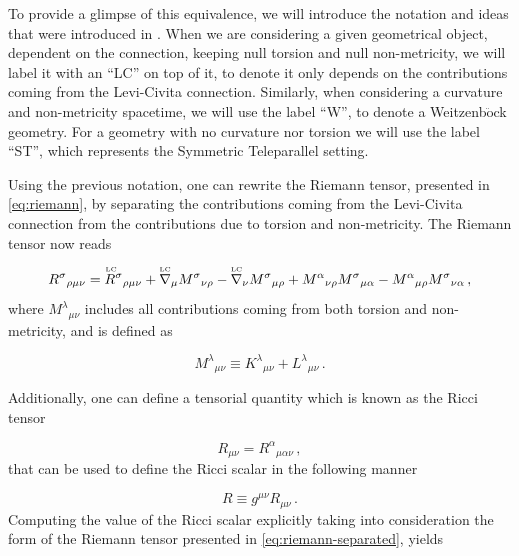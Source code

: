 To provide a glimpse of this equivalence, we will introduce the notation and ideas that were introduced in \cite{Jaerv2018}. When we are considering a given geometrical object, dependent on the connection, keeping null torsion and null non-metricity, we will label it with an ``LC'' on top of it, to denote it only depends on the contributions coming from the Levi-Civita connection. Similarly, when considering a curvature and non-metricity spacetime, we will use the label ``W'', to denote a Weitzenb$\ddot{\text{o}}$ck geometry. For a geometry with no curvature nor torsion we will use the label ``ST'', which represents the Symmetric Teleparallel setting.

Using the previous notation, one can rewrite the Riemann tensor, presented in \cref{eq:riemann}, by separating the contributions coming from the Levi-Civita connection from the contributions due to torsion and non-metricity. The Riemann tensor now reads

\begin{equation}
    \label{eq:riemann-separated}
    R^{\sigma}{}_{\rho \mu \nu} =
    \overtext{LC}{R}^{\sigma}{}_{\rho \mu \nu} +
    \overtext{LC}{\nabla}_{\mu}  M^{\sigma}{}_{\nu \rho} -
    \overtext{LC}{\nabla}_{\nu}  M^{\sigma}{}_{\mu \rho} +
    M^{\alpha}{}_{\nu \rho} M^{\sigma}{}_{\mu \alpha} -
    M^{\alpha}{}_{\mu \rho} M^{\sigma}{}_{\nu \alpha} \,,
\end{equation}
where $M^\lambda{}_{\mu \nu}$ includes all contributions coming from both torsion and non-metricity, and is defined as

\begin{equation}
    M^\lambda{}_{\mu \nu} \equiv K^\lambda{}_{\mu \nu} + L^\lambda{}_{\mu \nu} \,.
\end{equation}

\noindent Additionally, one can define a tensorial quantity which is known as the Ricci tensor

\begin{equation}
    R_{\mu \nu} = R^\alpha{}_{\mu \alpha \nu} \,,
\end{equation}
that can be used to define the Ricci scalar in the following manner

\begin{equation}
    R \equiv g^{\mu \nu} R_{\mu \nu} \,.
\end{equation}
Computing the value of the Ricci scalar explicitly taking into consideration the form of the Riemann tensor presented in \cref{eq:riemann-separated}, yields


